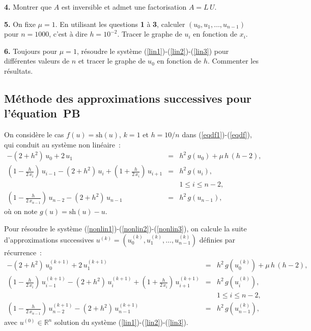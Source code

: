 \documentclass[a4paper,10pt]{article}
\begin{document}
\vspace{1ex}

\noindent
{\bf 4.} Montrer que $A$ est inversible et admet une factorisation $A = L\, U$.

\vspace{1ex}

\noindent
{\bf 5.} On fixe $\mu = 1$.
En utilisant les questions {\bf 1} \`a {\bf 3}, 
calculer $(u_0 , u_1 , \ldots , u_{n-1})$ pour $n=1000$, c'est \`a dire
$h=10^{-2}$.
Tracer le graphe de $u_i$ en fonction de $x_i$.

\vspace{1ex}

\noindent
{\bf 6.} 
Toujours pour $\mu = 1$, 
r\'esoudre le syst\`eme (\ref{lin1})-(\ref{lin2})-(\ref{lin3}) pour diff\'erentes valeurs de $n$ et
tracer le graphe de $u_0$ en fonction de $h$. Commenter les r\'esultats.

\subsection{\label{mod2}M\'ethode des approximations successives pour l'\'equation~PB}
On consid\`ere le cas $f(u)=\mathrm{sh}(u)$, $k=1$ et $h=10/n$
dans (\ref{eqdf1})-(\ref{eqdf}), qui conduit au syst\`eme non lin\'eaire~:
\begin{eqnarray}
\label{nonlin1}
-(2+h^2)\, u_0 + 2\, u_1 
&=&  
h^2\, g(u_0)
+\mu\, h\, (h-2) , \quad \quad\\
\label{nonlin2}
(1- \frac{h}{2\, x_i})\, u_{i-1}
-(2+h^2)\, u_i
+ (1+\frac{h}{2\, x_i})\, u_{i+1}&=&h^2\, g(u_i), \\
\nonumber
 & &
1 \leq i \leq n-2 ,
\\
\label{nonlin3}
(1- \frac{h}{2\, x_{n-1}})\, u_{n-2}
-(2+h^2)\, u_{n-1}
&=&h^2\, g(u_{n-1}),
\end{eqnarray}
o\`u on note $g(u)=\mathrm{sh}(u) - u$.

Pour r\'esoudre le syst\`eme (\ref{nonlin1})-(\ref{nonlin2})-(\ref{nonlin3}), on 
calcule la suite d'approximations successives $u^{(k)}=(u_0^{(k)} , u_1^{(k)} , \ldots , u_{n-1}^{(k)})$
d\'efinies par r\'ecurrence~:
\begin{eqnarray}
\label{nonlin1iter}
-(2+h^2)\, u_0^{(k+1)} + 2\, u_1^{(k+1)} 
&=&  
h^2\, g(u_0^{(k)})
+\mu\, h\, (h-2) , \quad \quad\\
\label{nonlin2iter}
(1- \frac{h}{2\, x_i})\, u_{i-1}^{(k+1)}
-(2+h^2)\, u_i^{(k+1)}
+ (1+\frac{h}{2\, x_i})\, u_{i+1}^{(k+1)}&=&h^2\, g(u_i^{(k)}), \\
\nonumber
 & &
1 \leq i \leq n-2 ,
\\
\label{nonlin3iter}
(1- \frac{h}{2\, x_{n-1}})\, u_{n-2}^{(k+1)}
-(2+h^2)\, u_{n-1}^{(k+1)}
&=&h^2\, g(u_{n-1}^{(k)}),
\end{eqnarray}
avec $u^{(0)}\in \mathbb{R}^n$ solution du syst\`eme (\ref{lin1})-(\ref{lin2})-(\ref{lin3}).
\end{document}
